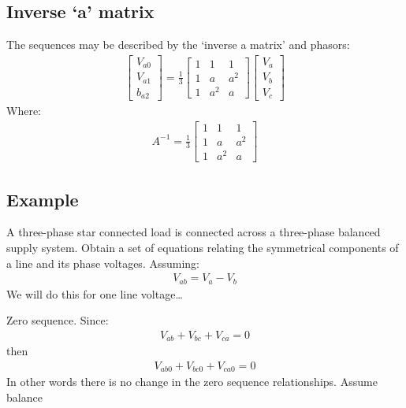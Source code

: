 \subsection{Inverse `a' matrix}
The sequences may be described by the `inverse a matrix' and phasors:
\begin{gather}
	\begin{bmatrix}
		V_{a0} \\
		V_{a1} \\
		b_{a2}
	\end{bmatrix} = \frac{1}{3}\begin{bmatrix}
		1 & 1   & 1   \\
		1 & a   & a^2 \\
		1 & a^2 & a
	\end{bmatrix}\begin{bmatrix}
		V_a \\
		V_b \\
		V_c
	\end{bmatrix}
\end{gather}
Where:
\begin{gather}
	A^{-1} = \frac{1}{3}\begin{bmatrix}
		1 & 1   & 1   \\
		1 & a   & a^2 \\
		1 & a^2 & a
	\end{bmatrix}
\end{gather}
\subsection{Example}
A three-phase star connected load is connected across a three-phase balanced supply system. Obtain a set of equations relating the symmetrical components of a line and its phase voltages. Assuming:
\begin{gather}
	V_{ab} = V_a - V_b
\end{gather}
We will do this for one line voltage\dots

Zero sequence. Since:
\begin{gather}
	V_{ab} + V_{bc} + V_{ca} = 0
\end{gather}
then
\begin{gather}
	V_{ab0} + V_{bc0} + V_{ca0} = 0
\end{gather}
In other words there is no change in the zero sequence relationships. Assume balance

